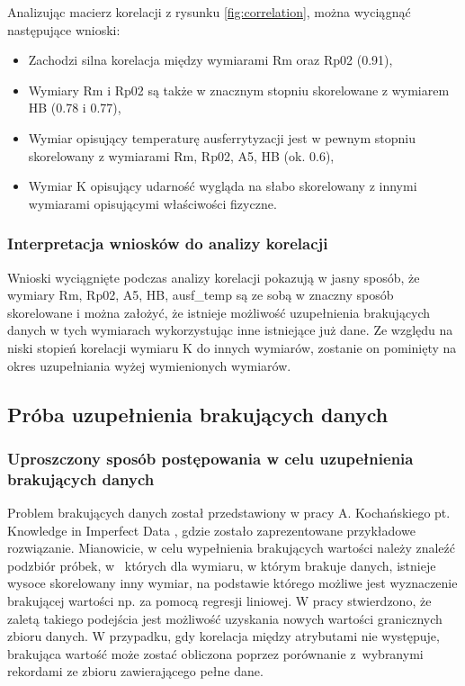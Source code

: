Analizując macierz korelacji z rysunku \ref{fig:correlation}, można wyciągnąć następujące wnioski:
\begin{itemize}
    \item Zachodzi silna korelacja między wymiarami Rm oraz Rp02 (0.91),
    \item Wymiary Rm i Rp02 są także w znacznym stopniu skorelowane z wymiarem HB (0.78 i 0.77),
    \item Wymiar opisujący temperaturę ausferrytyzacji jest w pewnym stopniu skorelowany z wymiarami Rm, Rp02, A5, HB (ok. 0.6),
    \item Wymiar K opisujący udarność wygląda na słabo skorelowany z innymi wymiarami opisującymi właściwości fizyczne.
\end{itemize}

\subsubsection{Interpretacja wniosków do analizy korelacji}
Wnioski wyciągnięte podczas analizy korelacji pokazują w jasny sposób, że wymiary Rm, Rp02, A5, HB, ausf\_temp są ze sobą w znaczny sposób skorelowane i można założyć, że istnieje możliwość uzupełnienia brakujących danych w tych wymiarach wykorzystując inne istniejące już dane.
Ze względu na niski stopień korelacji wymiaru K do innych wymiarów, zostanie on pominięty na okres uzupełniania wyżej wymienionych wymiarów.

\subsection{Próba uzupełnienia brakujących danych}\label{sec:filling_data}

\subsubsection{Uproszczony sposób postępowania w celu uzupełnienia brakujących danych}
Problem brakujących danych został przedstawiony w pracy A. Kochańskiego pt. Knowledge in Imperfect Data \cite{Kochanski12}, gdzie zostało zaprezentowane przykładowe rozwiązanie. Mianowicie, w celu wypełnienia brakujących wartości należy znaleźć podzbiór próbek, w~ których dla wymiaru, w którym brakuje danych, istnieje wysoce skorelowany inny wymiar, na podstawie którego możliwe jest wyznaczenie brakującej wartości np. za pomocą regresji liniowej. W pracy stwierdzono, że zaletą takiego podejścia jest możliwość uzyskania nowych wartości granicznych zbioru danych. W przypadku, gdy korelacja między atrybutami nie występuje, brakująca wartość może zostać obliczona poprzez porównanie z~wybranymi rekordami ze zbioru zawierającego pełne dane.

